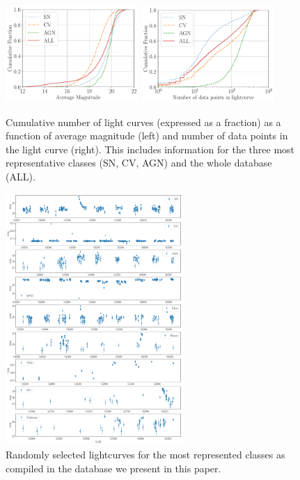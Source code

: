 \documentclass[a4paper,fleqn,usenatbib]{mnras}
\begin{document}
\begin{figure}
	\includegraphics[width=0.45\textwidth]{cumulative_magnitude.pdf}
  \includegraphics[width=0.45\textwidth]{cumulative_classes.pdf}
  \caption{Cumulative number of light curves (expressed as a fraction)
    as a function of average magnitude (left) and number of data
    points in the light curve (right).
    This includes information for the three most representative
    classes (SN, CV, AGN) and the whole database (ALL).}
  \label{fig:cumulative}
\end{figure} 



\begin{figure}
  \includegraphics[width=0.6\textwidth]{examples_transient.pdf}
  \caption{Randomly selected lightcurves for the most represented classes as
    compiled in the database we present in this paper.}  
  \label{fig:examples_transient}
\end{figure} 
\end{document}
